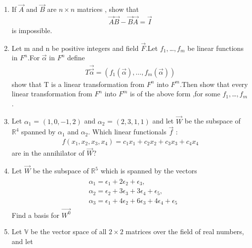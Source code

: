 \begin{enumerate}[label=\thesubsection.\arabic*.,ref=\thesubsection.\theenumi]
%
\\
\solution

\item If $\vec{A}$ and $\vec{B}$ are $n\times n$ matrices , show that
\begin{align}
 \vec{A}\vec{B}-\vec{B}\vec{A} = \vec{I}\label{eq:solutions/3/5/5/3}  
\end{align}
is impossible.
%
\\
\solution

\item Let m and n be positive integers and field $\vec{F}$.Let $f_1,$\dots$,f_m$ be linear functions in $F^n$.For $\vec{\alpha}$ in $F^n$ define
\begin{align}
    T\vec{\vec{\alpha}}=(f_1(\vec{\alpha}),\dots,f_m(\vec{\alpha})) \label{eq:solutions/3/5/6/eq:main}
\end{align}
show that T is a linear transformation from $F^n$ into $F^m$.Then show that every linear transformation from $F^n$ into $F^m$ is of the above form ,for some $f_1,$\dots$,f_m$.
%
\\
\solution

\item Let $\alpha_1$ = $(1, 0,-1, 2)$ and $\alpha_2$ = $(2,3, 1,1)$ and let $\vec{W}$ be the subspace of $\mathbb{R}^4$ spanned by $\alpha_1$ and $\alpha_2$. Which linear functionals $\vec{f}$ :
\begin{align}
f(x_1,x_2,x_3,x_4) = c_1x_1 + c_2x_2 + c_3x_3 + c_4x_4 \label{eq:solutions/3/5/7/3} 
\end{align}
are in the annihilator of $\vec{W}$?
%
\\
\solution

\item Let $\vec{W}$ be the subspace of $\mathbb{R}^5$ which is spanned by the vectors  
   \begin{multline}
    \begin{aligned}
    &\alpha_1=\epsilon_1+2\epsilon_2+\epsilon_3,\\ &\alpha_2=\epsilon_2+3\epsilon_3+3\epsilon_4+\epsilon_5,\\&\alpha_3=\epsilon_1+4\epsilon_2+6\epsilon_3+4\epsilon_4+\epsilon_5
    \end{aligned}
    \end{multline}
    Find a basis for $\vec{W^0}$
%
\\
\solution

\item Let $\mathbb{V}$ be the vector space of all $2 \times 2$ matrices over the field of real numbers, and let

\end{enumerate}
